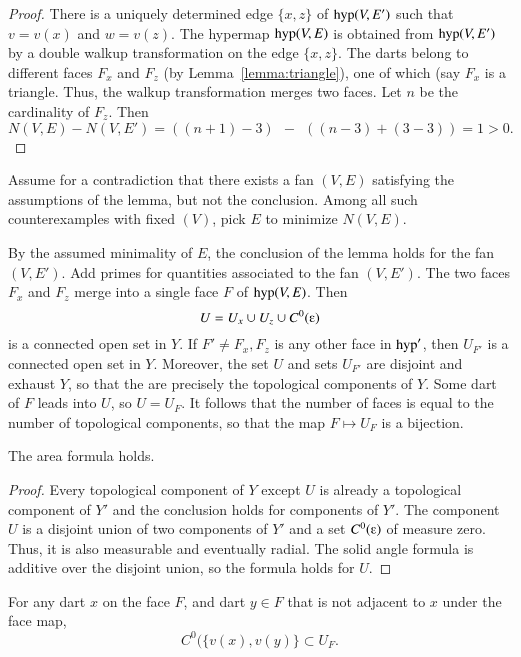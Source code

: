 \begin{proof}  There is a uniquely determined edge $\{x,z\}$ of ${\operatorname{hyp}}(V,E')$ such that $v=v(x)$ and $w=v(z)$.   The hypermap ${\operatorname{hyp}}(V,E)$ is obtained from ${\operatorname{hyp}}(V,E')$ by a double walkup transformation on the edge $\{x,z\}$.  The darts belong to different faces $F_x$ and $F_z$ (by Lemma~\ref{lemma:triangle}), one of which (say $F_x$ is a triangle.  Thus, the walkup transformation merges two faces.  Let $n$ be the cardinality of $F_z$. Then 
$$N(V,E) - N(V,E') = ((n+1)-3) ~~-~~ ((n-3) + (3-3)) = 1 >0.$$
\end{proof}

Assume for a contradiction that there exists a fan $(V,E)$ 
satisfying the assumptions of the lemma, but not the conclusion.
Among all such counterexamples with fixed $(V)$,  pick
$E$ to minimize  $N(V,E)$.

By the assumed minimality of $E$, the conclusion of the lemma holds for the
fan $(V,E')$.  Add primes
for quantities associated to the fan $(V,E')$.  The two faces
$F_x$ and $F_z$ merge into a single face $F$ of ${\operatorname{hyp}}(V,E)$.
Then 
\begin{equation}\label{eqn:U}
U= U_{x}\cup U_{z}\cup C^0(\e)
\end{equation} 
is a connected open set in $Y$.
If $F'\ne F_x,F_z$ is any other face in ${\operatorname{hyp}}'$, then $U_{F'}$ is
a connected open set in $Y$.  Moreover, the set $U$ and sets $U_{F'}$
are disjoint and exhaust $Y$, so that the are precisely the topological
components of $Y$.  Some dart of $F$ leads into $U$, so $U=U_F$.  It follows
that the number of faces is equal to the number of topological components, so that the map $F\mapsto U_F$ is a bijection.

\begin{lemma} The area formula holds.
\end{lemma}

\begin{proof} Every topological component of $Y$ 
except $U$ is already a topological component of $Y'$ and the conclusion
holds for components of $Y'$.  The component $U$ is a disjoint union of two
components of $Y'$ and a set $C^0(\e)$ of measure zero.  Thus, it
is also measurable and eventually radial.  The solid angle formula is
additive over the disjoint union, so the formula holds for $U$.
\end{proof}

\begin{lemma}  For any dart $x$ on the face $F$, and dart $y\in F$ that is not adjacent to $x$ under the face map, 
$$
C^0(\{v(x),v(y)\} \subset U_F.
$$
\end{lemma}


